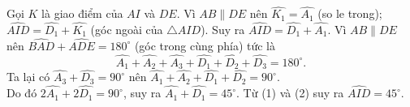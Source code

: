 \begin{vd}
{\begin{center}
\begin{tikzpicture}[line join = round, line cap = round,>=stealth,font=\footnotesize,scale=.8]
			\end{tikzpicture}
		\end{center}
		Gọi $K$ là giao điểm của $AI$ và $DE$.
		Vì $AB \parallel DE$ nên $\widehat{K_1} = \widehat{A_1}$ (so le trong); $\widehat{AID} = \widehat{D_1} + \widehat{K_1}$ (góc ngoài của $\triangle AID$). Suy ra $\widehat{AID} = \widehat{D_1} + \widehat{A_1}$. 
		Vì $AB \parallel DE$ nên $\widehat{BAD} + \widehat{ADE} = 180^\circ$ (góc trong cùng phía) tức là 
		\[\widehat{A_1} + \widehat{A_2} + \widehat{A_3} + \widehat{D_1} + \widehat{D_2} + \widehat{D_3} = 180^\circ.\]
		Ta lại có $\widehat{A_3} + \widehat{D_3} = 90^\circ$ nên $\widehat{A_1} + \widehat{A_2} + \widehat{D_1}+ \widehat{D_2} = 90^\circ$.\\
		Do đó $2\widehat{A_1} + 2\widehat{D_1} = 90^\circ$, suy ra $\widehat{A_1} + \widehat{D_1} = 45^\circ$. 
		Từ (1) và (2) suy ra $\widehat{AID} = 45^\circ$.
	}
\end{vd}

